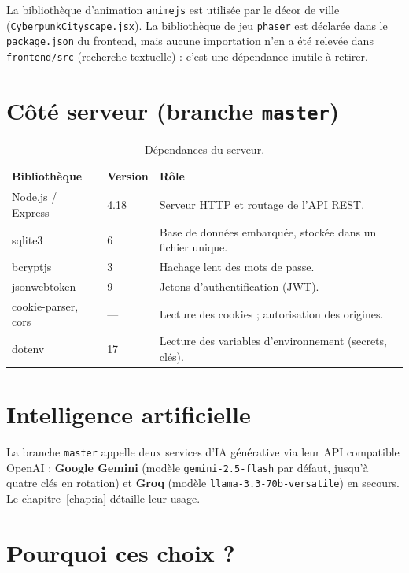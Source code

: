 \documentclass[11pt,a4paper]{report}
\newcommand{\code}[1]{\texttt{\nolinkurl{#1}}}
\newcommand{\file}[1]{\texttt{\nolinkurl{#1}}}
\begin{document}
La biblioth\`eque d'animation \texttt{animejs} est utilis\'ee par le d\'ecor de ville
(\file{CyberpunkCityscape.jsx}). La biblioth\`eque de jeu \texttt{phaser} est d\'eclar\'ee dans
le \file{package.json} du frontend, mais aucune importation n'en a \'et\'e relev\'ee dans
\file{frontend/src} (recherche textuelle) : c'est une d\'ependance inutile \`a retirer.
\medskip

\section{C\^ot\'e serveur (branche \texttt{master})}

\begin{table}[H]
\centering
\small
\begin{tabularx}{\textwidth}{@{}llX@{}}
\toprule
\textbf{Biblioth\`eque} & \textbf{Version} & \textbf{R\^ole} \\
\midrule
Node.js / Express   & 4.18   & Serveur HTTP et routage de l'API REST. \\
sqlite3             & 6      & Base de donn\'ees embarqu\'ee, stock\'ee dans un fichier unique. \\
bcryptjs            & 3      & Hachage lent des mots de passe. \\
jsonwebtoken        & 9      & Jetons d'authentification (JWT). \\
cookie-parser, cors & ---    & Lecture des cookies ; autorisation des origines. \\
dotenv              & 17     & Lecture des variables d'environnement (secrets, cl\'es). \\
\bottomrule
\end{tabularx}
\caption{D\'ependances du serveur.}
\end{table}

\section{Intelligence artificielle}

La branche \code{master} appelle deux services d'IA g\'en\'erative via leur API
compatible OpenAI : \textbf{Google Gemini} (mod\`ele \texttt{gemini-2.5-flash} par
d\'efaut, jusqu'\`a quatre cl\'es en rotation) et \textbf{Groq} (mod\`ele
\texttt{llama-3.3-70b-versatile}) en secours. Le chapitre~\ref{chap:ia} d\'etaille
leur usage.

\section{Pourquoi ces choix ?}
\end{document}
